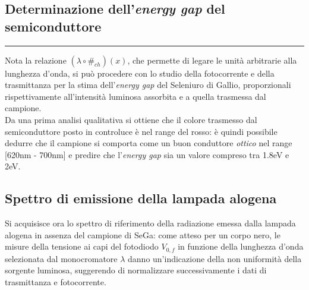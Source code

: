 \begin{center}
\section{Determinazione dell'\textit{energy gap} del semiconduttore}
\medskip
\end{center}
{\color{gray}\hrule}
\medskip
Nota la relazione $(\lambda \circ \#_{ch} )(x)$, che permette di legare le unità arbitrarie alla lunghezza d'onda, si può procedere con lo studio della fotocorrente e della trasmittanza per la stima dell'\textit{energy gap} del Seleniuro di Gallio, proporzionali rispettivamente all'intensità luminosa assorbita e a quella trasmessa dal campione.\\ Da una prima analisi qualitativa si ottiene che il colore trasmesso dal semiconduttore posto in controluce è nel range del rosso: è quindi possibile dedurre che il campione si comporta come un buon conduttore \textit{ottico} nel range  [620nm - 700nm] e predire che l'\textit{energy gap} sia un valore compreso tra 1.8eV e 2eV.


\subsection{Spettro di emissione della lampada alogena}
Si acquisisce ora lo spettro di riferimento della radiazione emessa dalla lampada alogena in assenza del campione di SeGa: come atteso per un corpo nero, le misure della tensione ai capi del fotodiodo $V_{0,f}$ in funzione della lunghezza d’onda selezionata dal monocromatore $\lambda$ danno un'indicazione della non uniformità della sorgente luminosa, suggerendo di normalizzare successivamente i dati di trasmittanza e fotocorrente.  \\

